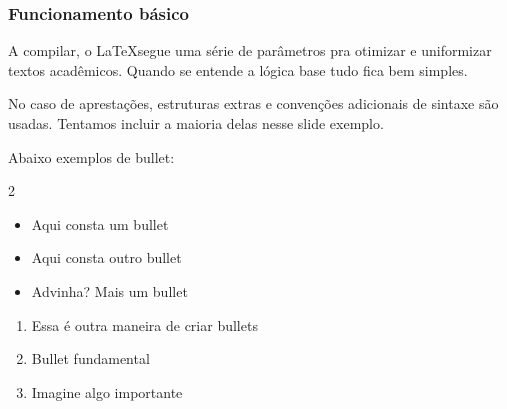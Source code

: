 \documentclass[aspectratio=169]{beamer} %
\begin{document}
\begin{frame}
    \frametitle{Funcionamento básico}

    A compilar, o \LaTeX segue uma série de parâmetros pra otimizar e uniformizar
    textos acadêmicos. Quando se entende a lógica base tudo fica bem simples.

    No caso de aprestações, estruturas extras e convenções
    adicionais de sintaxe são usadas. Tentamos incluir a maioria delas nesse slide
    exemplo.

    Abaixo exemplos de bullet:
    \vspace{1em} %




    \begin{multicols*}{2}

        \begin{minipage}{\columnwidth}
            \begin{itemize}

                \item Aqui consta um bullet
                \item Aqui consta outro bullet
                \item Advinha? Mais um bullet

            \end{itemize}

        \end{minipage}


        \columnbreak %

        \begin{minipage}{\columnwidth}

            \begin{enumerate}

                \item{Essa é outra maneira de criar bullets}
                \item Bullet fundamental
                \item Imagine algo importante

            \end{enumerate}
        \end{minipage}


    \end{multicols*}


\end{frame}
\end{document}
